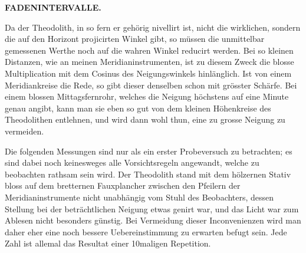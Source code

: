 \clearpage
\endgroup
\begingroup
\pagestyle{empty}
\newcommand{\GaussVICitation}[2]{%
  \begin{center}
  \parbox{#1\linewidth}{%
    \centering\footnotesize\frenchspacing
    \hrule height .3pt\relax\vspace{2.5pt}
    #2\par
    \vspace{2.5pt}\hrule height .3pt\relax
  }%
  \end{center}
  \par\nobreak\medskip
}
\newcommand{\GaussVIGathering}[2]{%
  \fancypagestyle{gaussVIGathering}{%
    \fancyhf{}%
    \renewcommand{\headrulewidth}{0pt}%
    \renewcommand{\footrulewidth}{0pt}%
    \fancyfoot[C]{\makebox[\textwidth][l]{%
      \hspace*{.025\textwidth}{\footnotesize\bfseries #1}\hfill
      {\normalsize\bfseries\textls[90]{#2}}\hspace*{.18\textwidth}}}%
  }%
  \thispagestyle{gaussVIGathering}%
}
\noindent{}%
\makebox[12mm][l]{}%
\parbox[t]{\dimexpr\linewidth-24mm\relax}{\centering\footnotesize\bfseries FADENINTERVALLE.\par}%
\par\nobreak\medskip
Da der Theodolith, in so fern er gehörig nivellirt ist, nicht die wirklichen, sondern die auf den
Horizont projicirten Winkel gibt, so müssen die unmittelbar gemessenen Werthe noch auf die wahren
Winkel reducirt werden. Bei so kleinen Distanzen, wie an meinen Meridianinstrumenten, ist zu diesem
Zweck die blosse Multiplication mit dem Cosinus des Neigungswinkels hinlänglich. Ist von einem
Meridiankreise die Rede, so gibt dieser denselben schon mit grösster Schärfe. Bei einem blossen
Mittagsfernrohr, welches die Neigung höchstens auf eine Minute genau angibt, kann man sie eben so
gut von dem kleinen Höhenkreise des Theodolithen entlehnen, und wird dann wohl thun, eine zu grosse
Neigung zu vermeiden.

Die folgenden Messungen sind nur als ein erster Probeversuch zu betrachten; es sind dabei noch
keinesweges alle Vorsichtsregeln angewandt, welche zu beobachten rathsam sein wird. Der Theodolith
stand mit dem hölzernen Stativ bloss auf dem bretternen Fauxplancher zwischen den Pfeilern der
Meridianinstrumente nicht unabhängig vom Stuhl des Beobachters, dessen Stellung bei der
beträchtlichen Neigung etwas genirt war, und das Licht war zum Ablesen nicht besonders günstig.
Bei Vermeidung dieser Inconvenienzen wird man daher eher eine noch bessere Uebereinstimmung zu
erwarten befugt sein. Jede Zahl ist allemal das Resultat einer 10maligen Repetition. 

